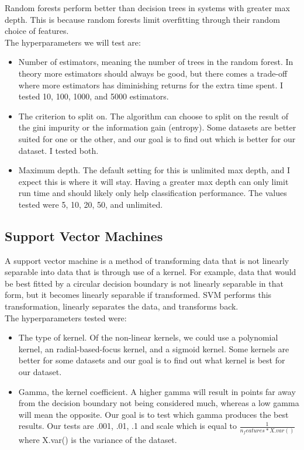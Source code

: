 \documentclass{article}
\begin{document}
Random forests perform better than decision trees in systems with greater max depth. This is because random forests limit overfitting through their random choice of features.\\

The hyperparameters we will test are:

\begin{itemize}
\item Number of estimators, meaning the number of trees in the random forest. In theory more estimators should always be good, but there comes a trade-off where more estimators has diminishing returns for the extra time spent. I tested 10, 100, 1000, and 5000 estimators.
\item The criterion to split on. The algorithm can choose to split on the result of the gini impurity or the information gain (entropy). Some datasets are better suited for one or the other, and our goal is to find out which is better for our dataset. I tested both.
\item Maximum depth. The default setting for this is unlimited max depth, and I expect this is where it will stay. Having a greater max depth can only limit run time and should likely only help classification performance. The values tested were 5, 10, 20, 50, and unlimited.
\end{itemize}

\subsection{Support Vector Machines}

A support vector machine is a method of transforming data that is not linearly separable into data that is through use of a kernel. For example, data that would be best fitted by a circular decision boundary is not linearly separable in that form, but it becomes linearly separable if transformed. SVM performs this transformation, linearly separates the data, and transforms back.\\

The hyperparameters tested were:

\begin{itemize}
\item The type of kernel. Of the non-linear kernels, we could use a polynomial kernel, an radial-based-focus kernel, and a sigmoid kernel. Some kernels are better for some datasets and our goal is to find out what kernel is best for our dataset.
\item Gamma, the kernel coefficient. A higher gamma will result in points far away from the decision boundary not being considered much, whereas a low gamma will mean the opposite. Our goal is to test which gamma produces the best results. Our tests are .001, .01, .1 and scale which is equal to $\frac{1}{n_features * X.var()}$ where X.var() is the variance of the dataset.
\end{itemize}
\end{document}

